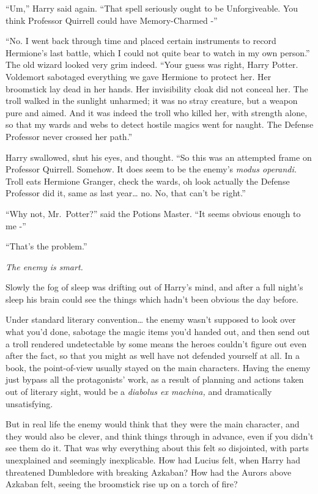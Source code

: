 ``Um,'' Harry said again. ``That spell seriously ought to be
Unforgiveable. You think Professor Quirrell could have Memory-Charmed
-''

``No. I went back through time and placed certain instruments to record
Hermione's last battle, which I could not quite bear to watch in my own
person.'' The old wizard looked very grim indeed. ``Your guess was
right, Harry Potter. Voldemort sabotaged everything we gave Hermione to
protect her. Her broomstick lay dead in her hands. Her invisibility
cloak did not conceal her. The troll walked in the sunlight unharmed; it
was no stray creature, but a weapon pure and aimed. And it was indeed
the troll who killed her, with strength alone, so that my wards and webs
to detect hostile magics went for naught. The Defense Professor never
crossed her path.''

Harry swallowed, shut his eyes, and thought. ``So this was an attempted
frame on Professor Quirrell. Somehow. It does seem to be the enemy's
\emph{modus operandi.} Troll eats Hermione Granger, check the wards, oh
look actually the Defense Professor did it, same as last year\ldots{}
no. No, that can't be right.''

``Why not, Mr.~Potter?'' said the Potions Master. ``It seems obvious
enough to me -''

``That's the problem.''

\emph{The enemy is smart.}

Slowly the fog of sleep was drifting out of Harry's mind, and after a
full night's sleep his brain could see the things which hadn't been
obvious the day before.

Under standard literary convention\ldots{} the enemy wasn't supposed to
look over what you'd done, sabotage the magic items you'd handed out,
and then send out a troll rendered undetectable by some means the heroes
couldn't figure out even after the fact, so that you might as well have
not defended yourself at all. In a book, the point-of-view usually
stayed on the main characters. Having the enemy just bypass all the
protagonists' work, as a result of planning and actions taken out of
literary sight, would be a \emph{diabolus ex machina,} and dramatically
unsatisfying.

But in real life the enemy would think that they were the main
character, and they would also be clever, and think things through in
advance, even if you didn't see them do it. That was why everything
about this felt so disjointed, with parts unexplained and seemingly
inexplicable. How had Lucius felt, when Harry had threatened Dumbledore
with breaking Azkaban? How had the Aurors above Azkaban felt, seeing the
broomstick rise up on a torch of fire?

